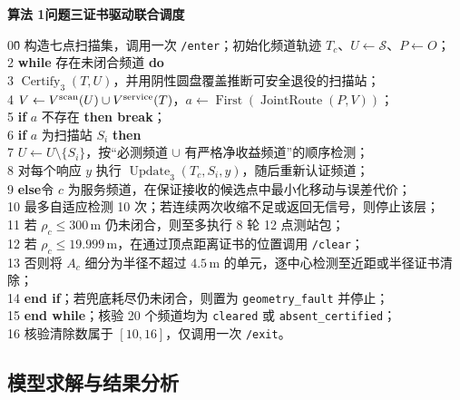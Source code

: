 \begin{mdframed}[
  nobreak=true,
  linewidth=0.6pt,
  innerleftmargin=7pt,
  innerrightmargin=7pt,
  innertopmargin=5pt,
  innerbottommargin=2pt,
  skipabove=6pt,
  skipbelow=6pt
]
\textbf{算法 1\quad 问题三证书驱动联合调度}
\begin{tabbing}
00\quad\=\quad\quad\=\quad\quad\= \> 构造七点扫描集，调用一次 \texttt{/enter}；初始化频道轨迹 $T_c$、$U\leftarrow\mathcal S$、$P\leftarrow O$；\\
2 \> \textbf{while} 存在未闭合频道 \textbf{do}\\
3 \>\> $\operatorname{Certify}_3(T,U)$，并用阴性圆盘覆盖推断可安全退役的扫描站；\\
4 \>\> $V\leftarrow V^{\rm scan}(U)\cup V^{\rm service}(T)$，$a\leftarrow\operatorname{First}(\operatorname{JointRoute}(P,V))$；\\
5 \>\> \textbf{if} $a$ 不存在 \textbf{then break}；\\
6 \>\> \textbf{if} $a$ 为扫描站 $S_i$ \textbf{then}\\
7 \>\>\> $U\leftarrow U\setminus\{S_i\}$，按“必测频道 $\cup$ 有严格净收益频道”的顺序检测；\\
8 \>\>\> 对每个响应 $y$ 执行 $\operatorname{Update}_3(T_c,S_i,y)$，随后重新认证频道；\\
9 \>\> \textbf{else}\quad 令 $c$ 为服务频道，在保证接收的候选点中最小化移动与误差代价；\\
10\>\>\> 最多自适应检测 10 次；若连续两次收缩不足或返回无信号，则停止该层；\\
11\>\>\> 若 $\rho_c\le300\,\mathrm m$ 仍未闭合，则至多执行 8 轮 12 点测站包；\\
12\>\>\> 若 $\rho_c\le19.999\,\mathrm m$，在通过顶点距离证书的位置调用 \texttt{/clear}；\\
13\>\>\> 否则将 $A_c$ 细分为半径不超过 $4.5\,\mathrm m$ 的单元，逐中心检测至近距或半径证书清除；\\
14\>\> \textbf{end if}；若兜底耗尽仍未闭合，则置为 \texttt{geometry\_fault} 并停止；\\
15\> \textbf{end while}；核验 20 个频道均为 \texttt{cleared} 或 \texttt{absent\_certified}；\\
16\> 核验清除数属于 $[10,16]$，仅调用一次 \texttt{/exit}。
\end{tabbing}
\end{mdframed}

\subsection{模型求解与结果分析}

